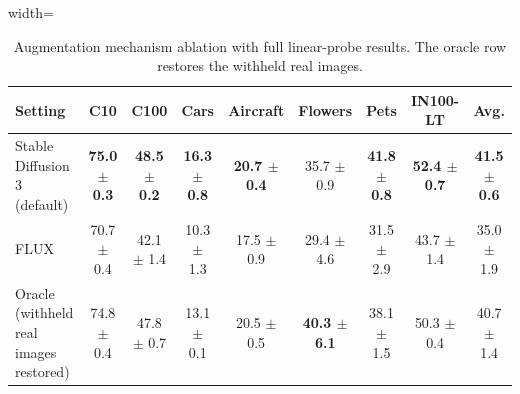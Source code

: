 \begin{table}[H]
\centering
\scriptsize
\setlength{\tabcolsep}{3.5pt}
\caption{Augmentation mechanism ablation with full linear-probe results. The oracle row restores the withheld real images.}
\label{tab:app_generation_linear}
\begin{adjustbox}{width=\textwidth}
\begin{tabular}{l c c c c c c c c}
\toprule
Setting & C10 & C100 & Cars & Aircraft & Flowers & Pets & IN100-LT & Avg. \\
\midrule
Stable Diffusion 3 (default) & \textbf{75.0 {\scriptsize$\pm$ 0.3}} & \textbf{48.5 {\scriptsize$\pm$ 0.2}} & \textbf{16.3 {\scriptsize$\pm$ 0.8}} & \textbf{20.7 {\scriptsize$\pm$ 0.4}} & 35.7 {\scriptsize$\pm$ 0.9} & \textbf{41.8 {\scriptsize$\pm$ 0.8}} & \textbf{52.4 {\scriptsize$\pm$ 0.7}} & \textbf{41.5 {\scriptsize$\pm$ 0.6}} \\
FLUX & 70.7 {\scriptsize$\pm$ 0.4} & 42.1 {\scriptsize$\pm$ 1.4} & 10.3 {\scriptsize$\pm$ 1.3} & 17.5 {\scriptsize$\pm$ 0.9} & 29.4 {\scriptsize$\pm$ 4.6} & 31.5 {\scriptsize$\pm$ 2.9} & 43.7 {\scriptsize$\pm$ 1.4} & 35.0 {\scriptsize$\pm$ 1.9} \\
Oracle (withheld real images restored) & 74.8 {\scriptsize$\pm$ 0.4} & 47.8 {\scriptsize$\pm$ 0.7} & 13.1 {\scriptsize$\pm$ 0.1} & 20.5 {\scriptsize$\pm$ 0.5} & \textbf{40.3 {\scriptsize$\pm$ 6.1}} & 38.1 {\scriptsize$\pm$ 1.5} & 50.3 {\scriptsize$\pm$ 0.4} & 40.7 {\scriptsize$\pm$ 1.4} \\
\bottomrule
\end{tabular}
\end{adjustbox}
\end{table}
